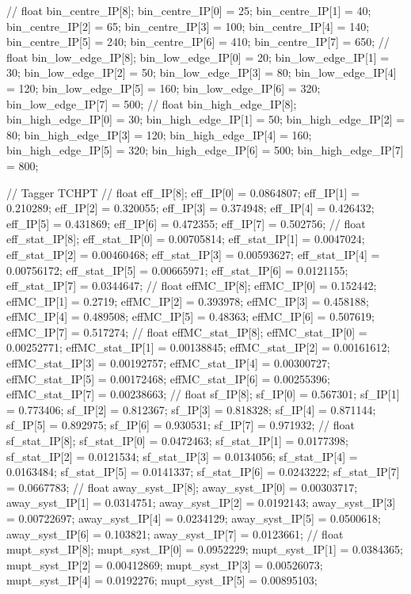 // float bin_centre_IP[8];
bin_centre_IP[0] = 25; bin_centre_IP[1] = 40; bin_centre_IP[2] = 65; 
bin_centre_IP[3] = 100; bin_centre_IP[4] = 140; bin_centre_IP[5] = 240; 
bin_centre_IP[6] = 410; bin_centre_IP[7] = 650; 
// float bin_low_edge_IP[8];
bin_low_edge_IP[0] = 20; bin_low_edge_IP[1] = 30; bin_low_edge_IP[2] = 50; 
bin_low_edge_IP[3] = 80; bin_low_edge_IP[4] = 120; bin_low_edge_IP[5] = 160; 
bin_low_edge_IP[6] = 320; bin_low_edge_IP[7] = 500; 
// float bin_high_edge_IP[8];
bin_high_edge_IP[0] = 30; bin_high_edge_IP[1] = 50; bin_high_edge_IP[2] = 80; 
bin_high_edge_IP[3] = 120; bin_high_edge_IP[4] = 160; bin_high_edge_IP[5] = 320; 
bin_high_edge_IP[6] = 500; bin_high_edge_IP[7] = 800; 


// Tagger TCHPT
// float eff_IP[8];
eff_IP[0] = 0.0864807; eff_IP[1] = 0.210289; eff_IP[2] = 0.320055; 
eff_IP[3] = 0.374948; eff_IP[4] = 0.426432; eff_IP[5] = 0.431869; 
eff_IP[6] = 0.472355; eff_IP[7] = 0.502756; 
// float eff_stat_IP[8];
eff_stat_IP[0] = 0.00705814; eff_stat_IP[1] = 0.0047024; eff_stat_IP[2] = 0.00460468; 
eff_stat_IP[3] = 0.00593627; eff_stat_IP[4] = 0.00756172; eff_stat_IP[5] = 0.00665971; 
eff_stat_IP[6] = 0.0121155; eff_stat_IP[7] = 0.0344647; 
// float effMC_IP[8];
effMC_IP[0] = 0.152442; effMC_IP[1] = 0.2719; effMC_IP[2] = 0.393978; 
effMC_IP[3] = 0.458188; effMC_IP[4] = 0.489508; effMC_IP[5] = 0.48363; 
effMC_IP[6] = 0.507619; effMC_IP[7] = 0.517274; 
// float effMC_stat_IP[8];
effMC_stat_IP[0] = 0.00252771; effMC_stat_IP[1] = 0.00138845; effMC_stat_IP[2] = 0.00161612; 
effMC_stat_IP[3] = 0.00192757; effMC_stat_IP[4] = 0.00300727; effMC_stat_IP[5] = 0.00172468; 
effMC_stat_IP[6] = 0.00255396; effMC_stat_IP[7] = 0.00238663; 
// float sf_IP[8];
sf_IP[0] = 0.567301; sf_IP[1] = 0.773406; sf_IP[2] = 0.812367; 
sf_IP[3] = 0.818328; sf_IP[4] = 0.871144; sf_IP[5] = 0.892975; 
sf_IP[6] = 0.930531; sf_IP[7] = 0.971932; 
// float sf_stat_IP[8];
sf_stat_IP[0] = 0.0472463; sf_stat_IP[1] = 0.0177398; sf_stat_IP[2] = 0.0121534; 
sf_stat_IP[3] = 0.0134056; sf_stat_IP[4] = 0.0163484; sf_stat_IP[5] = 0.0141337; 
sf_stat_IP[6] = 0.0243222; sf_stat_IP[7] = 0.0667783; 
// float away_syst_IP[8];
away_syst_IP[0] = 0.00303717; away_syst_IP[1] = 0.0314751; away_syst_IP[2] = 0.0192143; 
away_syst_IP[3] = 0.00722697; away_syst_IP[4] = 0.0234129; away_syst_IP[5] = 0.0500618; 
away_syst_IP[6] = 0.103821; away_syst_IP[7] = 0.0123661; 
// float mupt_syst_IP[8];
mupt_syst_IP[0] = 0.0952229; mupt_syst_IP[1] = 0.0384365; mupt_syst_IP[2] = 0.00412869; 
mupt_syst_IP[3] = 0.00526073; mupt_syst_IP[4] = 0.0192276; mupt_syst_IP[5] = 0.00895103; 
